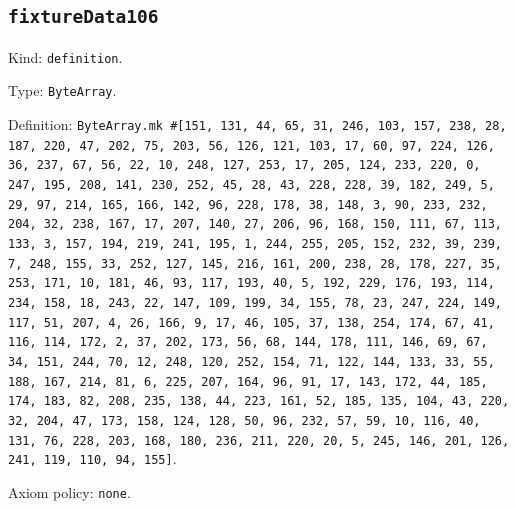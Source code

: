 \documentclass[11pt]{article}
\begin{document}
\subsection*{\texttt{fixtureData106}}
\noindent Kind: \texttt{definition}.\par
\noindent Type: \texttt{ByteArray}.\par
\noindent Definition: \texttt{ByteArray.mk \#[151, 131, 44, 65, 31, 246, 103, 157, 238, 28, 187, 220, 47, 202, 75, 203, 56, 126, 121, 103, 17, 60, 97, 224, 126, 36, 237, 67, 56, 22, 10, 248, 127, 253, 17, 205, 124, 233, 220, 0, 247, 195, 208, 141, 230, 252, 45, 28, 43, 228, 228, 39, 182, 249, 5, 29, 97, 214, 165, 166, 142, 96, 228, 178, 38, 148, 3, 90, 233, 232, 204, 32, 238, 167, 17, 207, 140, 27, 206, 96, 168, 150, 111, 67, 113, 133, 3, 157, 194, 219, 241, 195, 1, 244, 255, 205, 152, 232, 39, 239, 7, 248, 155, 33, 252, 127, 145, 216, 161, 200, 238, 28, 178, 227, 35, 253, 171, 10, 181, 46, 93, 117, 193, 40, 5, 192, 229, 176, 193, 114, 234, 158, 18, 243, 22, 147, 109, 199, 34, 155, 78, 23, 247, 224, 149, 117, 51, 207, 4, 26, 166, 9, 17, 46, 105, 37, 138, 254, 174, 67, 41, 116, 114, 172, 2, 37, 202, 173, 56, 68, 144, 178, 111, 146, 69, 67, 34, 151, 244, 70, 12, 248, 120, 252, 154, 71, 122, 144, 133, 33, 55, 188, 167, 214, 81, 6, 225, 207, 164, 96, 91, 17, 143, 172, 44, 185, 174, 183, 82, 208, 235, 138, 44, 223, 161, 52, 185, 135, 104, 43, 220, 32, 204, 47, 173, 158, 124, 128, 50, 96, 232, 57, 59, 10, 116, 40, 131, 76, 228, 203, 168, 180, 236, 211, 220, 20, 5, 245, 146, 201, 126, 241, 119, 110, 94, 155]}.\par
\noindent Axiom policy: \texttt{none}.\par
\end{document}
